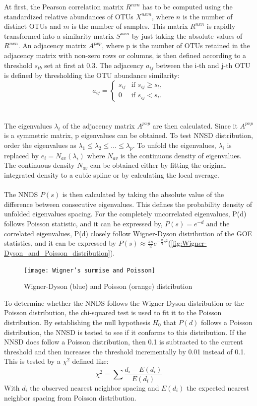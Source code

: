 At first, the Pearson correlation matrix $R^{nxn}$ has to be computed using the standardized relative abundances of OTUs $X^{nxm}$, where $n$ is the number of distinct OTUs and $m$ is the number of samples.
This matrix $R^{nxn}$ is rapidly transformed into a similarity matrix $S^{nxn}$ by just taking the absolute values of $R^{nxn}$.
An adjacency matrix $A^{pxp}$, where p is the number of OTUs retained in the adjacency matrix with non-zero rows or columns, is then defined according to a threshold $s_{tb}$ set at first at 0.3.
The adjacency $a_{ij}$ between the i-th and j-th OTU is defined by thresholding the OTU abundance similarity:
\[a_{ij} =
\begin{cases}
s_{ij} & \text{if } s_{ij} \geq s_t, \\
0 & \text{if } s_{ij} < s_t.
\end{cases}\]
\\\\
\noindent The eigenvalues $\lambda_i$ of the adjacency matrix $A^{pxp}$ are then calculated.
Since it $A^{pxp}$ is a symmetric matrix, p eigenvalues can be obtained.
To test NNSD distribution, order the eigenvalues as $\lambda_1 \leq \lambda_2 \leq \ldots \leq \lambda_p$.
To unfold the eigenvalues, $\lambda_i$ is replaced by $e_i = N_{av}(\lambda_i)$ where $N_{av}$ is the continuous density of eigenvalues.
The continuous density $N_{av}$ can be obtained either by fitting the original integrated density to a cubic spline or by calculating the local average.
\\\\
The NNDS $P(s)$ is then calculated by taking the absolute value of the difference between consecutive eigenvalues.
This defines the probability density of unfolded eigenvalues spacing.
For the completely uncorrelated eigenvalues, P(d) follows Poisson statistic, and it can be expressed by, $P(s)=e^{-d}$ and the correlated eigenvalues, P(d) closely follow Wigner-Dyson distribution of the GOE statistics, and it can be expressed by $P(s) \approx \frac{\pi s}{2}e^{-\frac{\pi}{4}s^2}$(\autoref{fig:Wigner-Dyson_and_Poisson_distribution}).

\begin{figure}[H]
    \centering
    \texttt{[image: Wigner’s surmise and Poisson]} %
    \caption{Wigner-Dyson (blue) and Poisson (orange) distribution}
    \label{fig:Wigner-Dyson_and_Poisson_distribution}
\end{figure}

To determine whether the NNDS follows the Wigner-Dyson distribution or the Poisson distribution, the chi-squared test is used to fit it to the Poisson distribution.
By establishing the null hypothesis $H_0$ that $P(d)$ follows a Poisson distribution, the NNSD is tested to see if it conforms to this distribution.
If the NNSD does follow a Poisson distribution, then 0.1 is subtracted to the current threshold and then increases the threshold incrementally by 0.01 instead of 0.1.
This is tested by a $\chi^2$ defined like:
\[\chi^2=\sum \frac{d_i-E(d_i)}{E(d_i)}\]
With $d_i$ the observed nearest neighbor spacing and $E(d_i)$ the expected nearest neighbor spacing from Poisson distribution.

